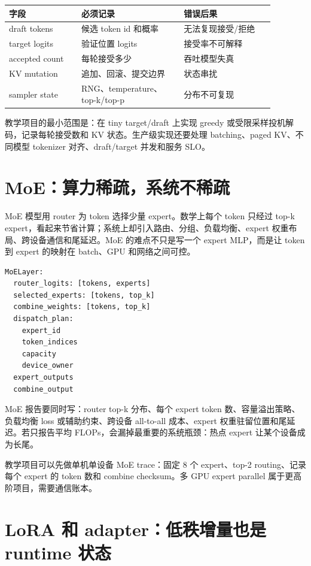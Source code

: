 \begin{center}
\small
\begin{tabular}{p{0.24\linewidth}p{0.34\linewidth}p{0.30\linewidth}}
\toprule
字段 & 必须记录 & 错误后果 \\
\midrule
draft tokens & 候选 token id 和概率 & 无法复现接受/拒绝 \\
target logits & 验证位置 logits & 接受率不可解释 \\
accepted count & 每轮接受多少 & 吞吐模型失真 \\
KV mutation & 追加、回滚、提交边界 & 状态串扰 \\
sampler state & RNG、temperature、top-k/top-p & 分布不可复现 \\
\bottomrule
\end{tabular}
\end{center}

教学项目的最小范围是：在 tiny target/draft 上实现 greedy 或受限采样投机解码，记录每轮接受数和 KV 状态。生产级实现还要处理 batching、paged KV、不同模型 tokenizer 对齐、draft/target 并发和服务 SLO。

\section{MoE：算力稀疏，系统不稀疏}

MoE 模型用 router 为 token 选择少量 expert。数学上每个 token 只经过 top-k expert，看起来节省计算；系统上却引入路由、分组、负载均衡、expert 权重布局、跨设备通信和尾延迟。MoE 的难点不只是写一个 expert MLP，而是让 token 到 expert 的映射在 batch、GPU 和网络之间可控。

\begin{lstlisting}[numbers=none,caption={MoE 层状态}]
MoELayer:
  router_logits: [tokens, experts]
  selected_experts: [tokens, top_k]
  combine_weights: [tokens, top_k]
  dispatch_plan:
    expert_id
    token_indices
    capacity
    device_owner
  expert_outputs
  combine_output
\end{lstlisting}

MoE 报告要同时写：router top-k 分布、每个 expert token 数、容量溢出策略、负载均衡 loss 或辅助约束、跨设备 all-to-all 成本、expert 权重驻留位置和尾延迟。若只报告平均 FLOPs，会漏掉最重要的系统瓶颈：热点 expert 让某个设备成为长尾。

教学项目可以先做单机单设备 MoE trace：固定 8 个 expert、top-2 routing、记录每个 expert 的 token 数和 combine checksum。多 GPU expert parallel 属于更高阶项目，需要通信账本。

\section{LoRA 和 adapter：低秩增量也是 runtime 状态}

